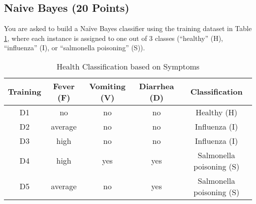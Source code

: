 \documentclass[a3paper,12pt]{article} %
\begin{document}
\subsection{Naive Bayes (20 Points)}
You are asked to build a Na\"ive Bayes classifier using the training dataset in Table \ref{tab:training_data}, where each instance is assigned to one out of 3 classes (“healthy” (H), “influenza” (I), or “salmonella poisoning” (S)).

\begin{table}[h]
\centering
\begin{tabular}{|c|c|c|c|c|}
\hline
Training &Fever (F) & Vomiting (V) & Diarrhea (D) & Classification \\
\hline
D1 & no & no & no & Healthy (H) \\
D2 & average & no & no & Influenza (I) \\
D3 & high & no & no & Influenza (I) \\
D4 & high & yes & yes & Salmonella poisoning (S) \\
D5 & average & no & yes & Salmonella poisoning (S) \\
\hline
\end{tabular}
\caption{Health Classification based on Symptoms}
\label{tab:training_data}
\end{table}
\end{document}
